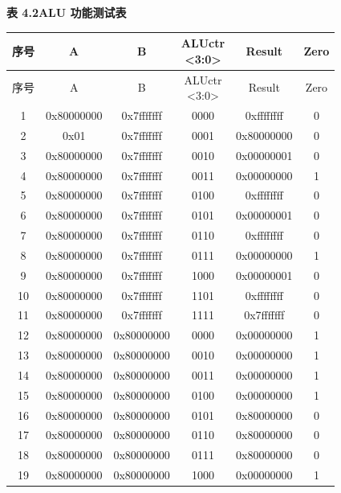\documentclass[UTF8,a4paper,11pt]{ctexart}
\begin{document}
\par\medskip
\begin{center}
\bfseries 表 4.2\quad ALU 功能测试表
\end{center}
\small
\setlength{\tabcolsep}{4pt}
\renewcommand{\arraystretch}{1.2}
\setlength{\LTleft}{0pt}
\setlength{\LTright}{0pt}
\begin{longtable}{|c|c|c|c|c|c|}
\hline
序号 & A & B & \shortstack{ALUctr\\<3:0>} & Result & Zero \\
\hline
\endfirsthead
\hline
序号 & A & B & \shortstack{ALUctr\\<3:0>} & Result & Zero \\
\hline
\endhead
1 & 0x80000000 & 0x7fffffff & 0000 & 0xffffffff & 0 \\
\hline
2 & 0x01 & 0x7fffffff & 0001 & 0x80000000 & 0 \\
\hline
3 & 0x80000000 & 0x7fffffff & 0010 & 0x00000001 & 0 \\
\hline
4 & 0x80000000 & 0x7fffffff & 0011 & 0x00000000 & 1 \\
\hline
5 & 0x80000000 & 0x7fffffff & 0100 & 0xffffffff & 0 \\
\hline
6 & 0x80000000 & 0x7fffffff & 0101 & 0x00000001 & 0 \\
\hline
7 & 0x80000000 & 0x7fffffff & 0110 & 0xffffffff & 0 \\
\hline
8 & 0x80000000 & 0x7fffffff & 0111 & 0x00000000 & 1 \\
\hline
9 & 0x80000000 & 0x7fffffff & 1000 & 0x00000001 & 0 \\
\hline
10 & 0x80000000 & 0x7fffffff & 1101 & 0xffffffff & 0 \\
\hline
11 & 0x80000000 & 0x7fffffff & 1111 & 0x7fffffff & 0 \\
\hline
12 & 0x80000000 & 0x80000000 & 0000 & 0x00000000 & 1 \\
\hline
13 & 0x80000000 & 0x80000000 & 0010 & 0x00000000 & 1 \\
\hline
14 & 0x80000000 & 0x80000000 & 0011 & 0x00000000 & 1 \\
\hline
15 & 0x80000000 & 0x80000000 & 0100 & 0x00000000 & 1 \\
\hline
16 & 0x80000000 & 0x80000000 & 0101 & 0x80000000 & 0 \\
\hline
17 & 0x80000000 & 0x80000000 & 0110 & 0x80000000 & 0 \\
\hline
18 & 0x80000000 & 0x80000000 & 0111 & 0x80000000 & 0 \\
\hline
19 & 0x80000000 & 0x80000000 & 1000 & 0x00000000 & 1 \\

\end{longtable}
\end{document}
